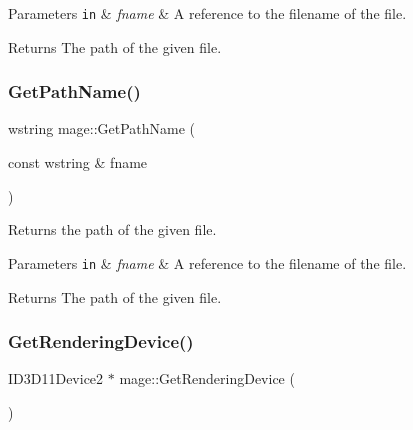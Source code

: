 \begin{DoxyParams}[1]{Parameters}
\mbox{\tt in}  & {\em fname} & A reference to the filename of the file. \\
\hline
\end{DoxyParams}
\begin{DoxyReturn}{Returns}
The path of the given file. 
\end{DoxyReturn}
\hypertarget{namespacemage_a171139f90ae3facdae52a61d5d73ddfa}{}\label{namespacemage_a171139f90ae3facdae52a61d5d73ddfa} 
\subsubsection{\texorpdfstring{Get\+Path\+Name()}{GetPathName()}\hspace{0.1cm}{\footnotesize\ttfamily [2/2]}}
{\footnotesize\ttfamily wstring mage\+::\+Get\+Path\+Name (\begin{DoxyParamCaption}\item[{const wstring \&}]{fname }\end{DoxyParamCaption})}

Returns the path of the given file.


\begin{DoxyParams}[1]{Parameters}
\mbox{\tt in}  & {\em fname} & A reference to the filename of the file. \\
\hline
\end{DoxyParams}
\begin{DoxyReturn}{Returns}
The path of the given file. 
\end{DoxyReturn}
\hypertarget{namespacemage_a30c7feb10b2be75bbce6d9c3739899c6}{}\label{namespacemage_a30c7feb10b2be75bbce6d9c3739899c6} 
\subsubsection{\texorpdfstring{Get\+Rendering\+Device()}{GetRenderingDevice()}}
{\footnotesize\ttfamily I\+D3\+D11\+Device2 $\ast$ mage\+::\+Get\+Rendering\+Device (\begin{DoxyParamCaption}{ }\end{DoxyParamCaption})}

\hypertarget{namespacemage_a55d3eaa7476e19ec8969e27d69249d95}{}\label{namespacemage_a55d3eaa7476e19ec8969e27d69249d95} 

